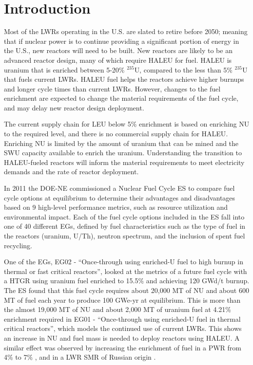 \section{Introduction}

Most of the \glspl{LWR} operating in the U.S. are slated to retire
before 2050; meaning that if nuclear power is to continue providing a 
significant portion of energy in the U.S., new reactors will need to be built. 
New reactors are likely to be an advanced reactor design, many of 
which require \gls{HALEU} for fuel. \gls{HALEU} is uranium that 
is enriched between 5-20\% $^{235}$U, compared to the less than 5\% $^{235}$U 
that fuels current \glspl{LWR}. \gls{HALEU} fuel helps 
the reactors achieve higher burnups and longer cycle times than current 
\glspl{LWR}. However, changes to the fuel enrichment are 
expected 
to change the material requirements of the fuel cycle, and may delay 
new reactor design deployment.

The current supply chain for \gls{LEU} below 5\% enrichment is based on 
enriching \gls{NU} to the required level, and there is no commercial 
supply chain for \gls{HALEU}.  
Enriching \gls{NU} is limited by the amount of uranium that can be 
mined and the \gls{SWU} capacity available to enrich the uranium. 
Understanding 
the transition to \gls{HALEU}-fueled reactors will inform the material 
requirements to meet electricity demands and 
the rate of reactor deployment.

In 2011 the \gls{DOE-NE} commissioned a Nuclear Fuel Cycle \gls{ES} 
\cite{wigeland_nuclear_2014} to compare fuel cycle options at equilibrium
to determine their advantages and disadvantages
based on 9 high-level performance metrics, such as resource utilization and 
environmental impact. Each of the fuel cycle options included in the 
\gls{ES} fall into one of 40 different \glspl{EG}, defined by fuel 
characteristics such as the type of fuel in the reactors (uranium, 
U/Th), neutron spectrum, and the inclusion of spent fuel recycling. 

One of the \glspl{EG}, \gls{EG}02 - ``Once-through using enriched-U fuel to 
high burnup in thermal or fast critical reactors'', looked at the metrics 
of a future fuel cycle with a \gls{HTGR} using uranium fuel enriched to 
15.5\% and achieving 120 GWd/t burnup. The \gls{ES} found that this fuel cycle
requires about 20,000 MT of \gls{NU} and about 600 MT of fuel each year 
to produce 100 GWe-yr at equilibrium. This is more than the 
almost 19,000 MT of \gls{NU} and about 2,000 MT of uranium fuel at 4.21\%
enrichment required in \gls{EG}01 - ``Once-through using enriched-U 
fuel in thermal critical reactors'', which models the continued use of current 
\glspl{LWR}. This shows an increase in \gls{NU} and fuel mass is needed to 
deploy reactors using \gls{HALEU}.
A similar effect was observed by increasing the enrichment of fuel in a 
\gls{PWR} from 4\% to 7\% \cite{burns_reactor_2020}, and in a \gls{LWR}
\gls{SMR} of Russian origin \cite{hernandez_potential_2020}. 

